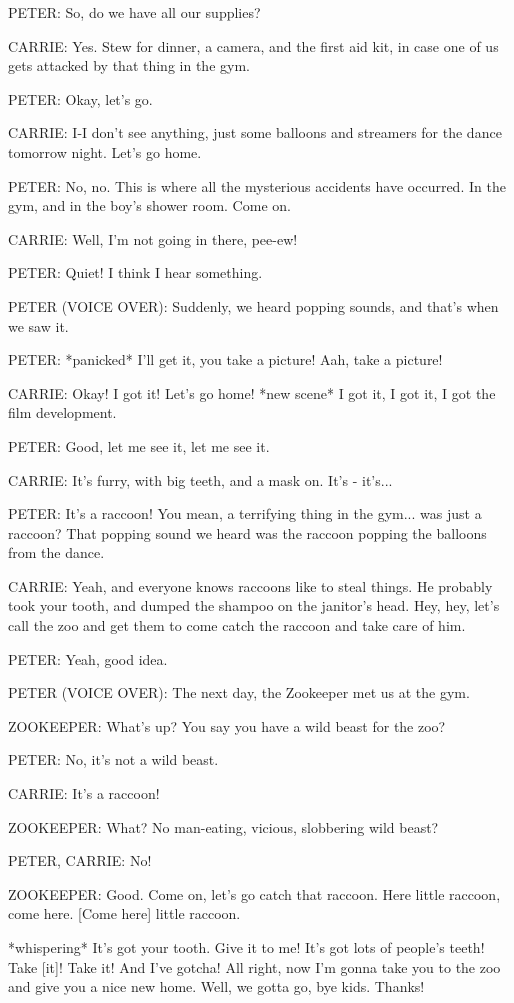 PETER:
So, do we have all our supplies?

CARRIE:
Yes.
Stew for dinner, a camera, and the first aid kit, in case one of us gets attacked by that thing in the gym.

PETER:
Okay, let's go.

CARRIE:
I-I don't see anything, just some balloons and streamers for the dance tomorrow night.
Let's go home.

PETER:
No, no.
This is where all the mysterious accidents have occurred.
In the gym, and in the boy's shower room.
Come on.

CARRIE:
Well, I'm not going in there, pee-ew!

PETER:
Quiet!
I think I hear something.

PETER (VOICE OVER):
Suddenly, we heard popping sounds, and that's when we saw it.

PETER:
*panicked*
I'll get it, you take a picture!
Aah, take a picture!

CARRIE:
Okay!
I got it!
Let's go home!
*new scene*
I got it, I got it, I got the film development.

PETER:
Good, let me see it, let me see it.

CARRIE:
It's furry, with big teeth, and a mask on.
It's - it's...

PETER:
It's a raccoon!
You mean, a terrifying thing in the gym...
was just a raccoon?
That popping sound we heard was the raccoon popping the balloons from the dance.

CARRIE:
Yeah, and everyone knows raccoons like to steal things.
He probably took your tooth, and dumped the shampoo on the janitor's head.
Hey, hey, let's call the zoo and get them to come catch the raccoon and take care of him.

PETER:
Yeah, good idea.

PETER (VOICE OVER):
The next day, the Zookeeper met us at the gym.

ZOOKEEPER:
What's up?
You say you have a wild beast for the zoo?

PETER:
No, it's not a wild beast.

CARRIE:
It's a raccoon!

ZOOKEEPER:
What?
No man-eating, vicious, slobbering wild beast?

PETER, CARRIE:
No!

ZOOKEEPER:
Good.
Come on, let's go catch that raccoon.
Here little raccoon, come here.
    [Come here] little raccoon.

*whispering*
It's got your tooth.
Give it to me!
It's got lots of people's teeth!
Take [it]! Take it!
And I've gotcha!
All right, now I'm gonna take you to the zoo and give you a nice new home.
Well, we gotta go, bye kids.
Thanks!


